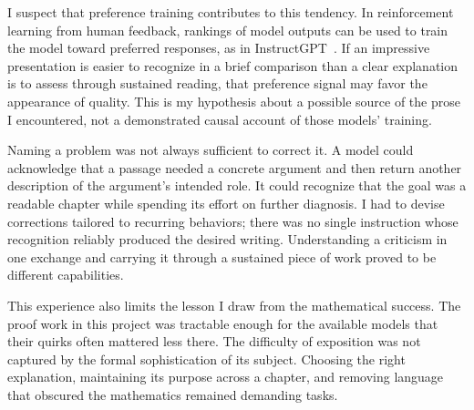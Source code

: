 I suspect that preference training contributes to this tendency. In
reinforcement learning from human feedback, rankings of model outputs can
be used to train the model toward preferred responses, as in
InstructGPT~\cite{aiOuyang2022}. If an impressive presentation is easier to
recognize in a brief comparison than a clear explanation is to assess
through sustained reading, that preference signal may favor the appearance
of quality. This is my hypothesis about a possible source of the prose I
encountered, not a demonstrated causal account of those models' training.

Naming a problem was not always sufficient to correct it. A model
could acknowledge that a passage needed a concrete argument and then return
another description of the argument's intended role. It could recognize
that the goal was a readable chapter while spending its effort on further
diagnosis. I had to devise corrections tailored to recurring behaviors;
there was no single instruction whose recognition reliably produced the
desired writing. Understanding a criticism in one exchange and carrying it
through a sustained piece of work proved to be different capabilities.

This experience also limits the lesson I draw from the mathematical success.
The proof work in this project was tractable enough for the available models
that their quirks often mattered less there. The difficulty of exposition
was not captured by the formal sophistication of its subject. Choosing the
right explanation, maintaining its purpose across a chapter, and removing
language that obscured the mathematics remained demanding tasks.
